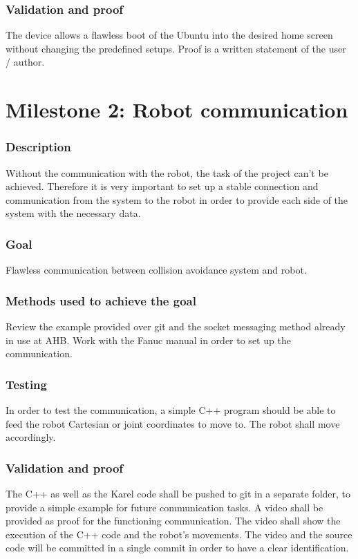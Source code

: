 \subsubsection{Validation and proof}
The device allows a flawless boot of the Ubuntu into the desired home screen without changing the predefined setups.
Proof is a written statement of the user / author.

\section{Milestone 2: Robot communication}
\label{chap:mile2}
\subsubsection{Description}
Without the communication with the robot, the task of the project can't be achieved. Therefore it is very important to set up a stable connection and communication from the system to the robot in order to provide each side of the system with the necessary data.
\subsubsection{Goal}
Flawless communication between collision avoidance system and robot.
\subsubsection{Methods used to achieve the goal}
Review the example provided over git and the socket messaging method already in use at AHB. Work with the Fanuc manual in order to set up the communication.
\subsubsection{Testing}
In order to test the communication, a simple C++ program should be able to feed the robot Cartesian or joint coordinates to move to. The robot shall move accordingly.
\subsubsection{Validation and proof}
The C++ as well as the Karel code shall be pushed to git in a separate folder, to provide a simple example for future communication tasks.
A video shall be provided as proof for the functioning communication. The video shall show the execution of the C++ code and the robot's movements. The video and the source code will be committed in a single commit in order to have a  clear identification.

